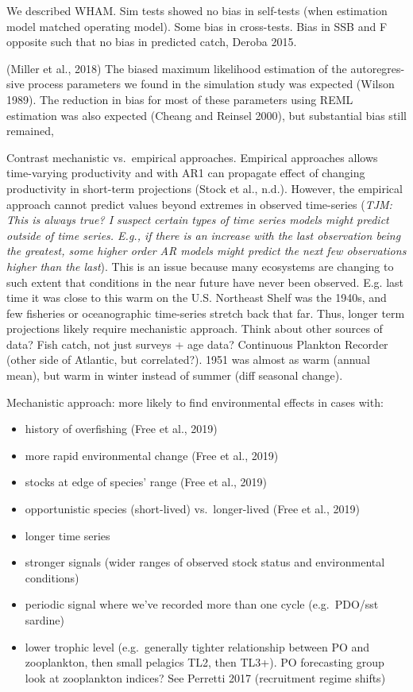 \documentclass[]{article}
\providecommand{\tightlist}{%
  \setlength{\itemsep}{0pt}\setlength{\parskip}{0pt}}
\begin{document}
We described WHAM. Sim tests showed no bias in self-tests (when
estimation model matched operating model). Some bias in cross-tests.
Bias in SSB and F opposite such that no bias in predicted catch, Deroba
2015.

(Miller et al., 2018) The biased maximum likelihood estimation of the
autoregres- sive process parameters we found in the simulation study was
expected (Wilson 1989). The reduction in bias for most of these
parameters using REML estimation was also expected (Cheang and Reinsel
2000), but substantial bias still remained,

Contrast mechanistic vs.~empirical approaches. Empirical approaches
allows time-varying productivity and with AR1 can propagate effect of
changing productivity in short-term projections (Stock et al., n.d.).
However, the empirical approach cannot predict values beyond extremes in
observed time-series (\emph{TJM: This is always true? I suspect certain
types of time series models might predict outside of time series. E.g.,
if there is an increase with the last observation being the greatest,
some higher order AR models might predict the next few observations
higher than the last}). This is an issue because many ecosystems are
changing to such extent that conditions in the near future have never
been observed. E.g. last time it was close to this warm on the U.S.
Northeast Shelf was the 1940s, and few fisheries or oceanographic
time-series stretch back that far. Thus, longer term projections likely
require mechanistic approach. Think about other sources of data? Fish
catch, not just surveys + age data? Continuous Plankton Recorder (other
side of Atlantic, but correlated?). 1951 was almost as warm (annual
mean), but warm in winter instead of summer (diff seasonal change).

Mechanistic approach: more likely to find environmental effects in cases
with:

\begin{itemize}
\tightlist
\item
  history of overfishing (Free et al., 2019)
\item
  more rapid environmental change (Free et al., 2019)
\item
  stocks at edge of species' range (Free et al., 2019)
\item
  opportunistic species (short-lived) vs.~longer-lived (Free et al.,
  2019)
\item
  longer time series
\item
  stronger signals (wider ranges of observed stock status and
  environmental conditions)
\item
  periodic signal where we've recorded more than one cycle (e.g.~PDO/sst
  sardine)
\item
  lower trophic level (e.g.~generally tighter relationship between PO
  and zooplankton, then small pelagics TL2, then TL3+). PO forecasting
  group look at zooplankton indices? See Perretti 2017 (recruitment
  regime shifts)
\end{itemize}
\end{document}

